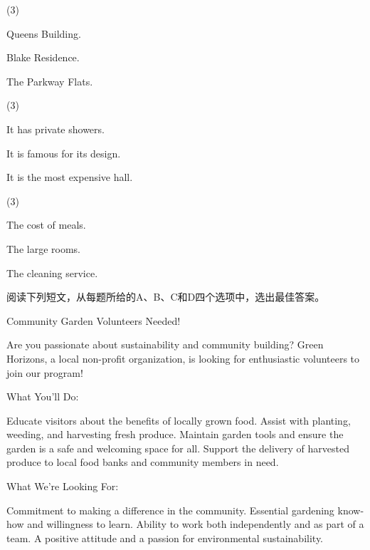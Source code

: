 \documentclass{英语试卷}
\begin{document}
\begin{choices}(3)
  \item Queens Building.
  \item Blake Residence.
  \item The Parkway Flats.
\end{choices}
\begin{choices}(3)
  \item It has private showers.
  \item It is famous for its design.
  \item It is the most expensive hall.
\end{choices}
\begin{choices}(3)
  \item The cost of meals.
  \item The large rooms.
  \item The cleaning service.
\end{choices}
\par 阅读下列短文，从每题所给的A、B、C和D四个选项中，选出最佳答案。\par
{}
\par Community Garden Volunteers Needed!\par
\par Are you passionate about sustainability and community building? Green Horizons, a local non-profit organization, is looking for enthusiastic volunteers to join our program!\par
\par What You'll Do:\par
\par Educate visitors about the benefits of locally grown food. Assist with planting, weeding, and harvesting fresh produce. Maintain garden tools and ensure the garden is a safe and welcoming space for all. Support the delivery of harvested produce to local food banks and community members in need.\par
\par What We're Looking For:\par
\par Commitment to making a difference in the community. Essential gardening know-how and willingness to learn. Ability to work both independently and as part of a team. A positive attitude and a passion for environmental sustainability.\par
\end{document}

